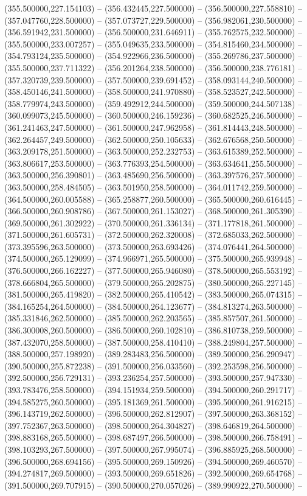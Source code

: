 (355.500000,227.154103) -- (356.432445,227.500000) -- (356.500000,227.558810) -- (357.047760,228.500000) -- (357.073727,229.500000) -- (356.982061,230.500000) -- (356.591942,231.500000) -- (356.500000,231.646911) -- (355.762575,232.500000) -- (355.500000,233.007257) -- (355.049635,233.500000) -- (354.815460,234.500000) -- (354.793124,235.500000) -- (354.922966,236.500000) -- (355.269786,237.500000) -- (355.500000,237.711322) -- (356.201264,238.500000) -- (356.500000,238.776181) -- (357.320739,239.500000) -- (357.500000,239.691452) -- (358.093144,240.500000) -- (358.450146,241.500000) -- (358.500000,241.970880) -- (358.523527,242.500000) -- (358.779974,243.500000) -- (359.492912,244.500000) -- (359.500000,244.507138) -- (360.099073,245.500000) -- (360.500000,246.159236) -- (360.682525,246.500000) -- (361.241463,247.500000) -- (361.500000,247.962958) -- (361.814443,248.500000) -- (362.264457,249.500000) -- (362.500000,250.105633) -- (362.676568,250.500000) -- (363.209178,251.500000) -- (363.500000,252.232753) -- (363.615389,252.500000) -- (363.806617,253.500000) -- (363.776393,254.500000) -- (363.634641,255.500000) -- (363.500000,256.390801) -- (363.485690,256.500000) -- (363.397576,257.500000) -- (363.500000,258.484505) -- (363.501950,258.500000) -- (364.011742,259.500000) -- (364.500000,260.005588) -- (365.258877,260.500000) -- (365.500000,260.616445) -- (366.500000,260.908786) -- (367.500000,261.153027) -- (368.500000,261.305390) -- (369.500000,261.302922) -- (370.500000,261.336134) -- (371.177818,261.500000) -- (371.500000,261.605731) -- (372.500000,262.320008) -- (372.685033,262.500000) -- (373.395596,263.500000) -- (373.500000,263.693426) -- (374.076441,264.500000) -- (374.500000,265.129099) -- (374.966971,265.500000) -- (375.500000,265.939948) -- (376.500000,266.162227) -- (377.500000,265.946080) -- (378.500000,265.553192) -- (378.666804,265.500000) -- (379.500000,265.202875) -- (380.500000,265.227145) -- (381.500000,265.419820) -- (382.500000,265.410542) -- (383.500000,265.074315) -- (384.165254,264.500000) -- (384.500000,264.123677) -- (384.813274,263.500000) -- (385.331846,262.500000) -- (385.500000,262.203565) -- (385.857507,261.500000) -- (386.300008,260.500000) -- (386.500000,260.102810) -- (386.810738,259.500000) -- (387.432070,258.500000) -- (387.500000,258.410410) -- (388.249804,257.500000) -- (388.500000,257.198920) -- (389.283483,256.500000) -- (389.500000,256.290947) -- (390.500000,255.872238) -- (391.500000,256.033560) -- (392.253598,256.500000) -- (392.500000,256.729131) -- (393.236254,257.500000) -- (393.500000,257.947330) -- (393.783476,258.500000) -- (394.151934,259.500000) -- (394.500000,260.291717) -- (394.585275,260.500000) -- (395.181369,261.500000) -- (395.500000,261.916215) -- (396.143719,262.500000) -- (396.500000,262.812907) -- (397.500000,263.368152) -- (397.752367,263.500000) -- (398.500000,264.304827) -- (398.646819,264.500000) -- (398.883168,265.500000) -- (398.687497,266.500000) -- (398.500000,266.758491) -- (398.103293,267.500000) -- (397.500000,267.995074) -- (396.885925,268.500000) -- (396.500000,268.694156) -- (395.500000,269.150926) -- (394.500000,269.460570) -- (394.274817,269.500000) -- (393.500000,269.651826) -- (392.500000,269.654768) -- (391.500000,269.707915) -- (390.500000,270.057026) -- (389.990922,270.500000) -- 